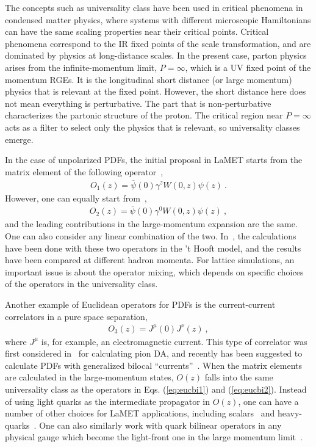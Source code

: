 The concepts such as universality class have been used
in critical phenomena in condensed matter physics,
where systems with different microscopic Hamiltonians
can have the same scaling properties near their critical
points. Critical phenomena correspond to the IR fixed points of the scale transformation,
and are dominated by physics at long-distance scales.
In the present case, parton physics arises from the
infinite-momentum limit, $P=\infty$,
which is a UV fixed point of the momentum RGEs. It
is the longitudinal short distance (or large momentum)
physics that is relevant at the fixed point.
However, the short distance here does not mean everything
is perturbative. The part that is non-perturbative
characterizes the partonic structure of the proton. The critical region
near $P=\infty$ acts as a filter to select only the physics
that is relevant, so universality classes emerge.

In the case of unpolarized PDFs, the initial proposal in LaMET
starts from the matrix element of the following operator~\cite{Ji:2013dva},
\begin{align}
	O_1(z)=  \overline{\psi}(0)\gamma^zW(0,z)\psi(z) \ .
	\label{eq:eucbi1}
\end{align}
However, one can equally start from~\cite{Radyushkin:2016hsy,Constantinou:2017sej},
\begin{align}
	O_2(z)= \overline{\psi}(0)\gamma^0W(0,z)\psi(z) \ ,
	\label{eq:eucbi2}
\end{align}
and the leading contributions in the large-momentum expansion are the same. One can
also consider any linear combination of the two.
In~\cite{Jia:2018qee}, the calculations have been done with
these two operators in the 't Hooft model,
and the results have been compared at different
hadron momenta. For lattice simulations,
an important issue is about the operator mixing, which
depends on specific choices of the operators
in the universality class.

Another example of Euclidean operators for PDFs
is the current-current correlators
in a pure space separation,
\begin{align}
	O_3(z)=J^\mu(0)J^\nu(z) \ ,
\end{align}
where $J^\mu$ is, for example, an electromagnetic current.
This type of correlator was first considered in~\cite{Braun:2007wv,Bali:2017gfr}
for calculating pion DA, and recently
has been suggested to calculate PDFs with generalized
bilocal ``currents''~\cite{Ma:2017pxb}.
When the matrix elements are calculated in the large-momentum states,
$O(z)$ falls into the same universality class as the operators in Eqs. (\ref{eq:eucbi1}) and
(\ref{eq:eucbi2}). Instead of using light quarks as the intermediate propagator
in $O(z)$, one can have a number of other choices for LaMET applications, including
scalars~\cite{Aglietti:1998ur,Abada:2001if} and
heavy-quarks~\cite{Detmold:2005gg}. One can also similarly
work with quark bilinear operators in any physical gauge which become the light-front one in
the large momentum limit~\cite{Gupta:1993vp}.

